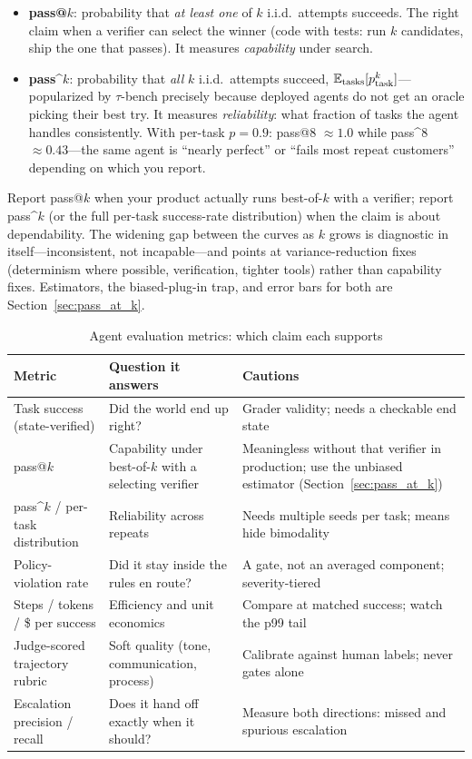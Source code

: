 \begin{itemize}
    \item \textbf{pass@$k$}: probability that \textit{at least one} of $k$ i.i.d.\ attempts succeeds. The right claim when a verifier can select the winner (code with tests: run $k$ candidates, ship the one that passes). It measures \textit{capability} under search.
    \item \textbf{pass\textasciicircum{}$k$}: probability that \textit{all} $k$ i.i.d.\ attempts succeed, $\operatorname{\mathbb{E}}_{\text{tasks}}[p_{\text{task}}^k]$---popularized by $\tau$-bench precisely because deployed agents do not get an oracle picking their best try. It measures \textit{reliability}: what fraction of tasks the agent handles consistently. With per-task $p = 0.9$: pass@8 $\approx 1.0$ while pass\textasciicircum{}8 $\approx 0.43$---the same agent is ``nearly perfect'' or ``fails most repeat customers'' depending on which you report.
\end{itemize}

Report pass@$k$ when your product actually runs best-of-$k$ with a verifier; report pass\textasciicircum{}$k$ (or the full per-task success-rate distribution) when the claim is about dependability. The widening gap between the curves as $k$ grows is diagnostic in itself---inconsistent, not incapable---and points at variance-reduction fixes (determinism where possible, verification, tighter tools) rather than capability fixes. Estimators, the biased-plug-in trap, and error bars for both are Section~\ref{sec:pass_at_k}.

\begin{table}[H]
\centering
\caption{Agent evaluation metrics: which claim each supports}
\label{tab:agent_eval_metrics}
\begin{tabularx}{\textwidth}{p{3.6cm}XX}
\toprule
\textbf{Metric} & \textbf{Question it answers} & \textbf{Cautions} \\
\midrule
Task success (state-verified) & Did the world end up right? & Grader validity; needs a checkable end state \\
pass@$k$ & Capability under best-of-$k$ with a selecting verifier & Meaningless without that verifier in production; use the unbiased estimator (Section~\ref{sec:pass_at_k}) \\
pass\textasciicircum{}$k$ / per-task distribution & Reliability across repeats & Needs multiple seeds per task; means hide bimodality \\
Policy-violation rate & Did it stay inside the rules en route? & A gate, not an averaged component; severity-tiered \\
Steps / tokens / \$ per success & Efficiency and unit economics & Compare at matched success; watch the p99 tail \\
Judge-scored trajectory rubric & Soft quality (tone, communication, process) & Calibrate against human labels; never gates alone \\
Escalation precision / recall & Does it hand off exactly when it should? & Measure both directions: missed and spurious escalation \\
\bottomrule
\end{tabularx}
\end{table}

